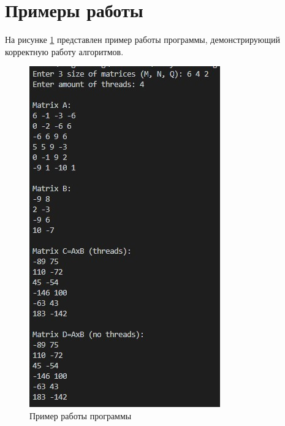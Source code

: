 \documentclass[12pt, a4paper]{report}
\begin{document}
	\section{Примеры работы}
	На рисунке \ref{pic:example} представлен пример работы программы, демонстрирующий корректную работу алгоритмов.
	\begin{figure}[ht!]
		\centering
		\includegraphics[scale=1]{example.jpg}
		\caption{Пример работы программы}
		\label{pic:example}
	\end{figure}
	
\end{document}
